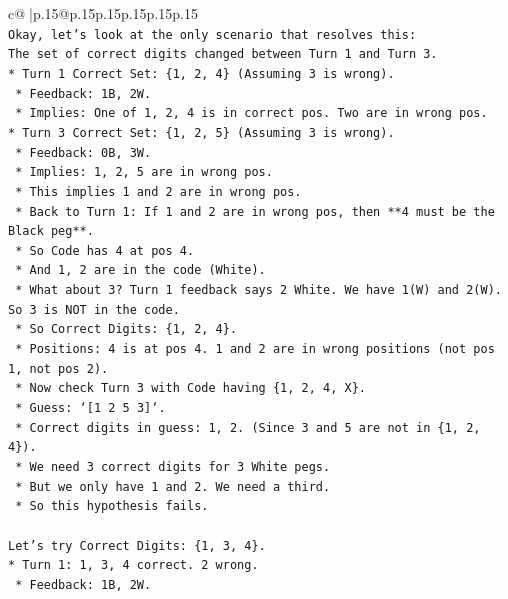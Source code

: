 \documentclass{article}
\begin{document}
{\begin{supertabular}{c@{$\;$}|p{.15\linewidth}@{}p{.15\linewidth}p{.15\linewidth}p{.15\linewidth}p{.15\linewidth}p{.15\linewidth}}
{{{\\ 
\texttt{Okay, let's look at the only scenario that resolves this:} \\
\texttt{The set of correct digits changed between Turn 1 and Turn 3.} \\
\texttt{*   Turn 1 Correct Set: \{1, 2, 4\} (Assuming 3 is wrong).} \\
\texttt{    *   Feedback: 1B, 2W.} \\
\texttt{    *   Implies: One of 1, 2, 4 is in correct pos. Two are in wrong pos.} \\
\texttt{*   Turn 3 Correct Set: \{1, 2, 5\} (Assuming 3 is wrong).} \\
\texttt{    *   Feedback: 0B, 3W.} \\
\texttt{    *   Implies: 1, 2, 5 are in wrong pos.} \\
\texttt{    *   This implies 1 and 2 are in wrong pos.} \\
\texttt{    *   Back to Turn 1: If 1 and 2 are in wrong pos, then **4 must be the Black peg**.} \\
\texttt{    *   So Code has 4 at pos 4.} \\
\texttt{    *   And 1, 2 are in the code (White).} \\
\texttt{    *   What about 3? Turn 1 feedback says 2 White. We have 1(W) and 2(W). So 3 is NOT in the code.} \\
\texttt{    *   So Correct Digits: \{1, 2, 4\}.} \\
\texttt{    *   Positions: 4 is at pos 4. 1 and 2 are in wrong positions (not pos 1, not pos 2).} \\
\texttt{    *   Now check Turn 3 with Code having \{1, 2, 4, X\}.} \\
\texttt{        *   Guess: `{[}1 2 5 3{]}`.} \\
\texttt{        *   Correct digits in guess: 1, 2. (Since 3 and 5 are not in \{1, 2, 4\}).} \\
\texttt{        *   We need 3 correct digits for 3 White pegs.} \\
\texttt{        *   But we only have 1 and 2. We need a third.} \\
\texttt{        *   So this hypothesis fails.} \\
\\ 
\texttt{Let's try Correct Digits: \{1, 3, 4\}.} \\
\texttt{*   Turn 1: 1, 3, 4 correct. 2 wrong.} \\
\texttt{    *   Feedback: 1B, 2W.} \\
}}}
\end{supertabular}}
\end{document}
